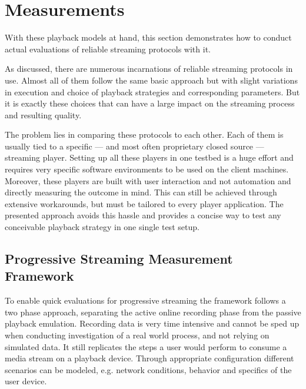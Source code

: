 \section{Measurements}
\label{c3:sec:measurements}

With these playback models at hand, this section demonstrates how to conduct actual evaluations of reliable streaming protocols with it.

As discussed, there are numerous incarnations of reliable streaming protocols in use. Almost all of them follow the same basic approach but with slight variations in execution and choice of playback strategies and corresponding parameters. But it is exactly these choices that can have a large impact on the streaming process and resulting quality. 

The problem lies in comparing these protocols to each other. Each of them is usually tied to a specific --- and most often proprietary closed source --- streaming player. Setting up all these players in one testbed is a huge effort and requires very specific software environments to be used on the client machines. Moreover, these players are built with user interaction and not automation and directly measuring the outcome in mind. This can still be achieved through extensive workarounds, but must be tailored to every player application. The presented approach avoids this hassle and provides a concise way to test any conceivable playback strategy in one single test setup.


\subsection{Progressive Streaming Measurement Framework}

To enable quick evaluations for progressive streaming the framework follows a two phase approach, separating the active online recording phase from the passive playback emulation. Recording data is very time intensive and cannot be sped up when conducting investigation of a real world process, and not relying on simulated data. It still replicates the steps a user would perform to consume a media stream on a playback device. Through appropriate configuration different scenarios can be modeled, e.g. network conditions, behavior and specifics of the user device.
 
